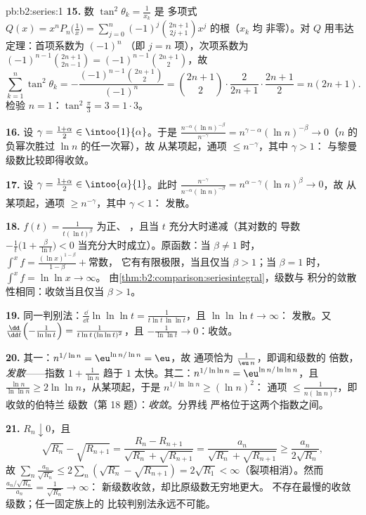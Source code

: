 \begin{solution}{pb:b2:series:1}
\textbf{15.} 数 $\tan^2\theta_k = \frac1{x_k}$ 是
多项式 $Q(x) = x^nP_n\bigl(\frac1x\bigr) =
\sum_{j=0}^n(-1)^j\binom{2n+1}{2j+1}x^j$ 的根（$x_k$ 均
非零）。对 $Q$ 用韦达定理：首项系数为 $(-1)^n$
（即 $j = n$ 项），次项系数为 $(-1)^{n-1}\binom{2n+1}{2n-1} =
(-1)^{n-1}\binom{2n+1}{2}$，故
\[
\sum_{k=1}^n\tan^2\theta_k =
-\frac{(-1)^{n-1}\binom{2n+1}2}{(-1)^n} = \binom{2n+1}2\cdot
\frac{2}{2n+1}\cdot\frac{2n+1}{2}
= n(2n+1).
\]
检验 $n = 1$：$\tan^2\frac\pi3 = 3 = 1\cdot3$。

\textbf{16.} 设 $\gamma = \frac{1+\alpha}2 \in
\intoo{1}{\alpha}$。于是 $\frac{n^{-\alpha}(\ln
n)^{-\beta}}{n^{-\gamma}} = n^{\gamma - \alpha}(\ln n)^{-\beta}
\to 0$（$n$ 的负幂次胜过 $\ln n$ 的任一次幂），故
从某项起，通项 $\leq n^{-\gamma}$，其中 $\gamma > 1$：
与黎曼级数比较即得收敛。

\textbf{17.} 设 $\gamma = \frac{1+\alpha}2 \in
\intoo{\alpha}{1}$。此时 $\frac{n^{-\gamma}}{n^{-\alpha}(\ln
n)^{-\beta}} = n^{\alpha-\gamma}(\ln n)^{\beta} \to 0$，故
从某项起，通项 $\geq n^{-\gamma}$，其中 $\gamma < 1$：
发散。

\textbf{18.} $f(t) = \frac1{t(\ln t)^\beta}$ 为正、
，且当 $t$ 充分大时递减（其对数的
导数 $-\frac1t\bigl(1 + \frac{\beta}{\ln t}\bigr) < 0$
当充分大时成立）。原函数：当 $\beta \neq 1$ 时，
$\int^x f = \frac{(\ln x)^{1-\beta}}{1-\beta} + \text{常数}$，
它有有限极限，当且仅当 $\beta > 1$；当 $\beta = 1$ 时，
$\int^x f = \ln\ln x \to \infty$。
由\cref{thm:b2:comparison:seriesintegral}，级数与
积分的敛散性相同：收敛当且仅当 $\beta > 1$。

\textbf{19.} 同一判别法：$\frac{\dd}{\dd t}\ln\ln\ln t =
\frac{1}{t\ln t\,\ln\ln t}$，且 $\ln\ln\ln t \to \infty$：
发散。又 $\frac{\dd}{\dd t}\Bigl(-\frac1{\ln\ln t}\Bigr)
= \frac{1}{t\ln t\,(\ln\ln t)^2}$，且 $-\frac1{\ln\ln t} \to
0$：收敛。

\textbf{20.} 其一：$n^{1/\ln n} = \eu^{\ln n/\ln n} = \eu$，故
通项恰为 $\frac{1}{\eu\,n}$，即调和级数的
倍数，\emph{发散}——指数 $1 +
\frac1{\ln n}$ 趋于 $1$ 太快。其二：$n^{1/\ln\ln n}
= \eu^{\ln n/\ln\ln n}$，且 $\frac{\ln n}{\ln\ln n} \geq
2\ln\ln n$，从某项起，于是 $n^{1/\ln\ln n} \geq (\ln n)^2$：
通项 $\leq \frac1{n(\ln n)^2}$，即收敛的伯特兰
级数（第 18 题）：\emph{收敛}。分界线
严格位于这两个指数之间。

\textbf{21.} $R_n \downarrow 0$，且
\[
\sqrt{R_n} - \sqrt{R_{n+1}} = \frac{R_n -
R_{n+1}}{\sqrt{R_n} + \sqrt{R_{n+1}}} =
\frac{a_n}{\sqrt{R_n} + \sqrt{R_{n+1}}} \geq
\frac{a_n}{2\sqrt{R_n}},
\]
故 $\sum_n \frac{a_n}{\sqrt{R_n}} \leq 2\sum_n(\sqrt{R_n} -
\sqrt{R_{n+1}}) = 2\sqrt{R_1} < \infty$（裂项相消）。然而
$\frac{a_n/\sqrt{R_n}}{a_n} = \frac1{\sqrt{R_n}} \to \infty$：
新级数收敛，却比原级数无穷地更大。
不存在最慢的收敛级数；任一固定族上的
比较判别法永远不可能。


\end{solution}
